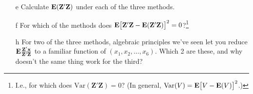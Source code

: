 \documentclass{article}
\begin{document}
\begin{enumerate}
\begin{minipage}{.45\linewidth}
\begin{itemize}
\item[e] Calculate $\mathbf{E}(\mathbf{Z}'\mathbf{Z})$ under each of the three methods.
\end{itemize}
\end{minipage}
% 
\begin{minipage}{.45\linewidth}
  \begin{itemize}
 \item[f] For which of the methods does $\mathbf{E}
  \big[\mathbf{Z}'\mathbf{Z} -\mathbf{E} (\mathbf{Z}'\mathbf{Z})\big]^{2} =
  0$?\footnote{I.e., for which does
    $\mathrm{Var}(\mathbf{Z}'\mathbf{Z}) = 0$?  (In general,
    $\mathrm{Var}(V) = \mathbf{E} \big[V - \mathbf{E}(V) \big]^{2} $.)}
\item[h] For two of the three methods, algebraic principles we've seen
  let you reduce
  $\mathbf{E} \frac{\mathbf{Z}'\mathbf{x}}{\mathbf{Z}'\mathbf{Z}}$ to a
  familiar function of $(x_{1}, x_{2}, \ldots, x_{6}) $.  Which 2 are
  these, and why doesn't the same thing work for the third?

  \end{itemize}
\end{minipage}
\end{enumerate}
\end{document}
